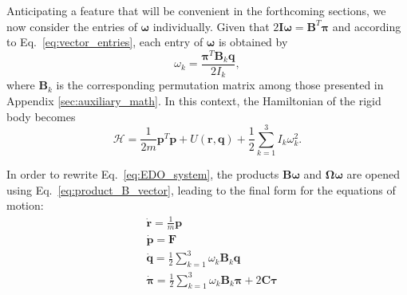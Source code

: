 \documentclass[aip,jcp,reprint,amsmath,amssymb]{revtex4-1}
\newcommand{\mt}[1]{\boldsymbol{\mathbf{#1}}}           %
\newcommand{\vt}[1]{\boldsymbol{\mathbf{#1}}}           %
\newcommand{\tr}[1]{#1^T}                               %
\begin{document}
Anticipating a feature that will be convenient in the forthcoming sections, we now consider the entries of $\vt \omega$ individually. Given that $2{\mt I}{\vt \omega} = \tr{\mt B}{\vt \pi}$ and according to Eq.~\ref{eq:vector_entries}, each entry of $\vt \omega$ is obtained by
\begin{equation}
\label{eq:omega_entry}
\omega_k = \frac{\tr{\vt \pi} {\mt B}_k \vt q}{2 I_k},
\end{equation}
where $\mt B_k$ is the corresponding permutation matrix among those presented in Appendix \ref{sec:auxiliary_math}. In this context, the Hamiltonian of the rigid body becomes
\[
\mathcal{H} = \frac{1}{2m} \tr{\vt p} \vt p + U(\vt r, \vt q) + \frac{1}{2} \sum_{k=1}^3 I_k \omega_k^2.
\]

In order to rewrite Eq.~\ref{eq:EDO_system}, the products $\mt B \vt \omega$ and $\mt \Omega \vt \omega$ are opened using Eq.~\ref{eq:product_B_vector}, leading to the final form for the equations of motion:
\begin{subequations}
\label{eq:EDO_system_alternative}
\begin{align}
&\dot{\vt r} = \frac{1}{m} \vt p \\
&\dot{\vt p} = \vt F \\
&\dot{\vt q} = \frac{1}{2} \sum_{k=1}^3 \omega_k {\mt B}_k \vt q \label{eq:edo_q} \\
&\dot{\vt \pi} = \frac{1}{2} \sum_{k=1}^3 \omega_k {\mt B}_k \vt \pi + 2 \mt C \vt \tau \label{eq:edo_pi}
\end{align}
\end{subequations}
\end{document}
